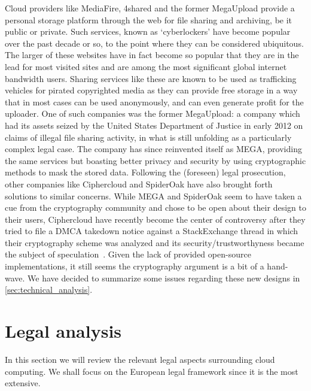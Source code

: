 \documentclass[12pt]{article}
\begin{document}
Cloud providers like MediaFire, 4shared and the former MegaUpload provide a personal storage platform through the web for file sharing and archiving, be it public or private.
Such services, known as `cyberlockers' have become popular over the past decade or so, to the point where they can be considered ubiquitous.
The larger of these websites have in fact become so popular that they are in the lead for most visited sites and are among the most significant global internet bandwidth users.
Sharing services like these are known to be used as trafficking vehicles for pirated copyrighted media as they can provide free storage in a way that in most cases can be used anonymously, and can even generate profit for the uploader.
One of such companies was the former MegaUpload: a company which had its assets seized by the United States Department of Justice in early 2012 on claims of illegal file sharing activity, in what is still unfolding as a particularly complex legal case.
The company has since reinvented itself as MEGA, providing the same services but boasting better privacy and security by using cryptographic methods to mask the stored data.
Following the (foreseen) legal prosecution, other companies like Ciphercloud and SpiderOak have also brought forth solutions to similar concerns.
While MEGA and SpiderOak seem to have taken a cue from the cryptography community and chose to be open about their design to their users, Ciphercloud have recently become the center of controversy after they tried to file a DMCA takedown notice against a StackExchange thread in which their cryptography scheme was analyzed and its security/trustworthyness became the subject of speculation~\cite{ciphercloud}.
Given the lack of provided open-source implementations, it still seems the cryptography argument is a bit of a hand-wave.
We have decided to summarize some issues regarding these new designs in \autoref{sec:technical_analysis}.


\section{Legal analysis}
\label{sec:legal_analysis}

In this section we will review the relevant legal aspects surrounding cloud computing. We shall focus on the European legal framework since it is the most extensive.
\end{document}

